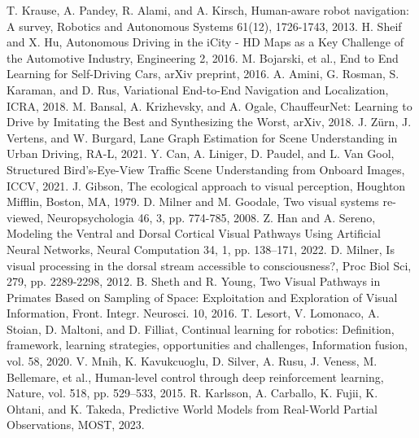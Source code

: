 \documentclass[letterpaper, 10 pt, conference]{ieeeconf}
\begin{document}
\begin{thebibliography}{99}

 T. Krause, A. Pandey, R. Alami, and A. Kirsch, Human-aware robot navigation: A survey, Robotics and Autonomous Systems 61(12), 1726-1743, 2013.
 H. Sheif and X. Hu, Autonomous Driving in the iCity - HD Maps as a Key Challenge of the Automotive Industry, Engineering 2, 2016.
 M. Bojarski, et al., End to End Learning for Self-Driving Cars, arXiv preprint, 2016.
 A. Amini, G. Rosman, S. Karaman, and D. Rus, Variational End-to-End Navigation and Localization, ICRA, 2018.
 M. Bansal, A. Krizhevsky, and A. Ogale, ChauffeurNet: Learning to Drive by Imitating the Best and Synthesizing the Worst, arXiv, 2018.
 J. Z\"urn, J. Vertens, and W. Burgard, Lane Graph Estimation for Scene Understanding in Urban Driving, RA-L, 2021.
 Y. Can, A. Liniger, D. Paudel, and L. Van Gool, Structured Bird’s-Eye-View Traffic Scene Understanding from Onboard Images, ICCV, 2021.
 J. Gibson, The ecological approach to visual perception, Houghton Mifflin, Boston, MA, 1979.
 D. Milner and M. Goodale, Two visual systems re-viewed, Neuropsychologia 46, 3, pp. 774-785, 2008.
 Z. Han and A. Sereno, Modeling the Ventral and Dorsal Cortical Visual Pathways Using Artificial Neural Networks, Neural Computation 34, 1, pp. 138–171, 2022.
 D. Milner, Is visual processing in the dorsal stream accessible to consciousness?, Proc Biol Sci, 279, pp. 2289-2298, 2012.
 B. Sheth and R. Young, Two Visual Pathways in Primates Based on Sampling of Space: Exploitation and Exploration of Visual Information, Front. Integr. Neurosci. 10, 2016.
 T. Lesort, V. Lomonaco, A. Stoian, D. Maltoni, and D. Filliat, Continual learning for robotics: Definition, framework, learning strategies, opportunities and challenges, Information fusion, vol. 58, 2020.
 V. Mnih, K. Kavukcuoglu, D. Silver, A. Rusu, J. Veness, M. Bellemare, et al., Human-level control through deep reinforcement learning, Nature, vol. 518, pp. 529--533, 2015.
 R. Karlsson, A. Carballo, K. Fujii, K. Ohtani, and K. Takeda, Predictive World Models from Real-World Partial Observations, MOST, 2023.

\end{thebibliography}
\end{document}
